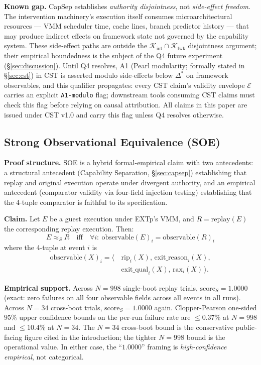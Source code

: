 \documentclass[conference]{IEEEtran}
\newcommand{\Kint}{\mathcal{K}_\text{int}}
\newcommand{\Kfwk}{\mathcal{K}_\text{fwk}}
\newcommand{\Dstar}{\Delta^{*}}
\newcommand{\scoreS}{\text{score}_S}
\begin{document}
\textbf{Known gap.} CapSep establishes \emph{authority disjointness},
not \emph{side-effect freedom}. The intervention machinery's
execution itself consumes microarchitectural resources --- VMM
scheduler time, cache lines, branch predictor history --- that may
produce indirect effects on framework state not governed by the
capability system. These side-effect paths are outside the
$\Kint \cap \Kfwk$ disjointness argument; their empirical
boundedness is the subject of the Q4 future experiment
(\S\ref{sec:discussion}). Until Q4 resolves, A1 (Pearl modularity;
formally stated in \S\ref{sec:cst}) in CST is asserted modulo
side-effects below $\Dstar$ on framework observables, and this
qualifier propagates: every CST claim's validity envelope
$\mathcal{E}$ carries an explicit \texttt{A1-modulo} flag; downstream
tools consuming CST claims must check this flag before relying on
causal attribution. All claims in this paper are issued under CST
v1.0 and carry this flag unless Q4 resolves otherwise.

\subsection{Strong Observational Equivalence (SOE)}\label{sec:soe}

\textbf{Proof structure.} SOE is a hybrid formal-empirical claim
with two antecedents: a structural antecedent (Capability
Separation, \S\ref{sec:capsep}) establishing that replay and original
execution operate under divergent authority, and an empirical
antecedent (comparator validity via four-field injection testing)
establishing that the 4-tuple comparator is faithful to its
specification.

\textbf{Claim.} Let $E$ be a guest execution under EXTp's VMM, and
$R = \text{replay}(E)$ the corresponding replay execution. Then:
\begin{equation}
E \approx_S R \quad \text{iff} \quad \forall i:\
\text{observable}(E)_i = \text{observable}(R)_i
\end{equation}
where the 4-tuple at event $i$ is
\begin{equation*}
\begin{aligned}
\text{observable}(X)_i = \langle\,&\text{rip}_i(X),\,\text{exit\_reason}_i(X), \\
                                  &\text{exit\_qual}_i(X),\,\text{rax}_i(X)\,\rangle.
\end{aligned}
\end{equation*}

\textbf{Empirical support.} Across $N{=}998$ single-boot replay
trials, $\scoreS = 1.0000$ (exact: zero failures on all four
observable fields across all events in all runs). Across $N{=}34$
cross-boot trials, $\scoreS = 1.0000$ again. Clopper-Pearson
one-sided $95\%$ upper confidence bounds on the per-run failure rate
are $\leq 0.37\%$ at $N{=}998$ and $\leq 10.4\%$ at $N{=}34$. The
$N{=}34$ cross-boot bound is the conservative public-facing figure
cited in the introduction; the tighter $N{=}998$ bound is the
operational value. In either case, the ``$1.0000$'' framing is
\emph{high-confidence empirical}, not categorical.
\end{document}
